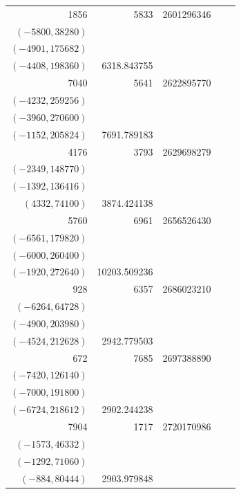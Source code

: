 \documentclass[11pt]{article}
\begin{document}
\begin{longtable}{r r r l r}
1856 & 5833 & 2601296346 & \begin{tabular}[t]{@{}l@{}}$(-5832,6696)$\\$(-5800,38280)$\\$(-4901,175682)$\\$(-4408,198360)$\end{tabular} & 6318.843755\\[5pt]
7040 & 5641 & 2622895770 & \begin{tabular}[t]{@{}l@{}}$(-5632,25344)$\\$(-4232,259256)$\\$(-3960,270600)$\\$(-1152,205824)$\end{tabular} & 7691.789183\\[5pt]
4176 & 3793 & 2629698279 & \begin{tabular}[t]{@{}l@{}}$(-3468,92820)$\\$(-2349,148770)$\\$(-1392,136416)$\\$(4332,74100)$\end{tabular} & 3874.424138\\[5pt]
5760 & 6961 & 2656526430 & \begin{tabular}[t]{@{}l@{}}$(-6936,46920)$\\$(-6561,179820)$\\$(-6000,260400)$\\$(-1920,272640)$\end{tabular} & 10203.509236\\[5pt]
928 & 6357 & 2686023210 & \begin{tabular}[t]{@{}l@{}}$(-6292,54340)$\\$(-6264,64728)$\\$(-4900,203980)$\\$(-4524,212628)$\end{tabular} & 2942.779503\\[5pt]
672 & 7685 & 2697388890 & \begin{tabular}[t]{@{}l@{}}$(-7560,88200)$\\$(-7420,126140)$\\$(-7000,191800)$\\$(-6724,218612)$\end{tabular} & 2902.244238\\[5pt]
7904 & 1717 & 2720170986 & \begin{tabular}[t]{@{}l@{}}$(-1700,16660)$\\$(-1573,46332)$\\$(-1292,71060)$\\$(-884,80444)$\end{tabular} & 2903.979848\\[5pt]

\end{longtable}
\end{document}
